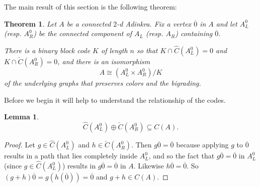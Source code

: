 \documentclass[12pt,twoside,singlespace]{article}
\numberwithin{equation}{section}
\newtheorem{thm}[equation]{Theorem}
\newtheorem{lem}[equation]{Lemma}
\theoremstyle{definition}
\begin{document}
The main result of this section is the following theorem:
\begin{thm}
\label{thm:quotient}
Let $A$ be a connected $2$-d Adinkra.  Fix a vertex $\overline{0}$ in $A$ and let $A_L^0$ (resp. $A_R^0$) be the connected component of $A_L$ (resp. $A_R$) containing $\overline{0}$.

There is a binary block code $K$ of length $n$ so that $K\cap \hat{C}(A_L^0)=0$ and $K\cap \check{C}(A_R^0)=0$, and there is an isomorphism
\[A\cong (A_L^0\times A_R^0)/K\]
of the underlying graphs that preserves colors and the bigrading.
\end{thm}

Before we begin it will help to understand the relationship of the codes.
\begin{lem}
\label{lem:cplus}
\[\hat{C}(A_L^0)\oplus \check{C}(A_R^0) \subseteq C(A).\]
\end{lem}
\begin{proof}
Let $g\in\hat{C}(A_L^0)$ and $h\in \check{C}(A_R^0)$.  Then $g\overline{0}=\overline{0}$ because applying $g$ to $\overline{0}$ results in a path that lies completely inside $A_L^0$, and so the fact that $g\overline{0}=\overline{0}$ in $A_L^0$ (since $g\in \hat{C}(A_L^0)$) results in $g\overline{0}=\overline{0}$ in $A$.  Likewise $h\overline{0}=\overline{0}$.  So $(g+h)\overline{0}=g(h(\overline{0}))=\overline{0}$ and $g+h\in C(A)$.
\end{proof}
\end{document}
